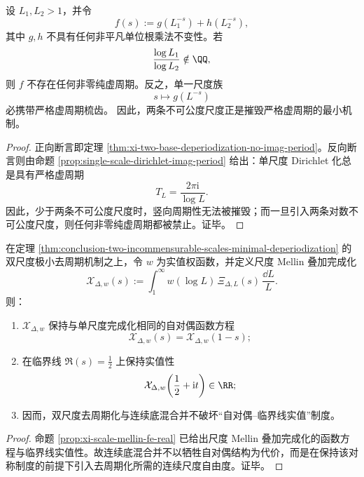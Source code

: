 \begin{theorem}[两尺度去周期化的最小性]\label{thm:conclusion-two-incommensurable-scales-minimal-deperiodization}
设 \(L_1,L_2>1\)，并令
\[
f(s):=g(L_1^{-s})+h(L_2^{-s}),
\]
其中 \(g,h\) 不具有任何非平凡单位根乘法不变性。若
\[
\frac{\log L_1}{\log L_2}\notin\QQ,
\]
则 \(f\) 不存在任何非零纯虚周期。反之，单一尺度族
\[
s\longmapsto g(L^{-s})
\]
必携带严格虚周期梳齿。
因此，两条不可公度尺度正是摧毁严格虚周期的最小机制。
\end{theorem}
\begin{proof}
正向断言即定理 \ref{thm:xi-two-base-deperiodization-no-imag-period}。反向断言则由命题 \ref{prop:single-scale-dirichlet-imag-period} 给出：单尺度 Dirichlet 化总是具有严格虚周期
\[
T_L=\frac{2\pi\mathrm{i}}{\log L}.
\]
因此，少于两条不可公度尺度时，竖向周期性无法被摧毁；而一旦引入两条对数不可公度尺度，则任何非零纯虚周期都被禁止。证毕。
\end{proof}

\begin{theorem}[对称去周期化与函数方程保持的可积完备性]\label{thm:conclusion-scale-mellin-deperiodization-preserves-selfdual-reality}
在定理 \ref{thm:conclusion-two-incommensurable-scales-minimal-deperiodization} 的双尺度极小去周期机制之上，令 \(w\) 为实值权函数，并定义尺度 Mellin 叠加完成化
\[
\mathcal X_{\Delta,w}(s)
:=
\int_1^\infty w(\log L)\,\Xi_{\Delta,L}(s)\,\frac{\dd L}{L}.
\]
则：
\begin{enumerate}
  \item \(\mathcal X_{\Delta,w}\) 保持与单尺度完成化相同的自对偶函数方程
  \[
  \mathcal X_{\Delta,w}(s)=\mathcal X_{\Delta,w}(1-s);
  \]
  \item 在临界线 \(\Re(s)=\frac12\) 上保持实值性
  \[
  \mathcal X_{\Delta,w}\!\left(\frac12+\mathrm{i}t\right)\in\RR;
  \]
  \item 因而，双尺度去周期化与连续底混合并不破坏“自对偶--临界线实值”制度。
\end{enumerate}
\end{theorem}
\begin{proof}
命题 \ref{prop:xi-scale-mellin-fe-real} 已给出尺度 Mellin 叠加完成化的函数方程与临界线实值性。故连续底混合并不以牺牲自对偶结构为代价，而是在保持该对称制度的前提下引入去周期化所需的连续尺度自由度。证毕。
\end{proof}

